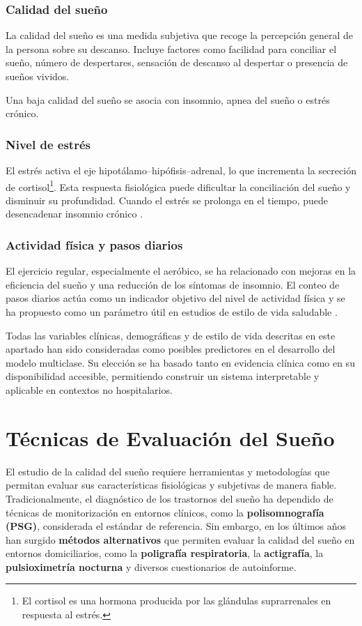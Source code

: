 \subsubsection{Calidad del sueño}
La calidad del sueño es una medida subjetiva que recoge la percepción general de la persona sobre su descanso. Incluye factores como facilidad para conciliar el sueño, número de despertares, sensación de descanso al despertar o presencia de sueños vividos.

Una baja calidad del sueño se asocia con insomnio, apnea del sueño o estrés crónico.


\subsubsection{Nivel de estrés}
El estrés activa el eje hipotálamo–hipófisis–adrenal, lo que incrementa la secreción de cortisol\footnote{El cortisol es una hormona producida por las glándulas suprarrenales en respuesta al estrés.}. Esta respuesta fisiológica puede dificultar la conciliación del sueño y disminuir su profundidad. Cuando el estrés se prolonga en el tiempo, puede desencadenar insomnio crónico \cite{nivel_estres}.


\subsubsection{Actividad física y pasos diarios}
El ejercicio regular, especialmente el aeróbico, se ha relacionado con mejoras en la eficiencia del sueño y una reducción de los síntomas de insomnio. El conteo de pasos diarios actúa como un indicador objetivo del nivel de actividad física y se ha propuesto como un parámetro útil en estudios de estilo de vida saludable \cite{efectoActividad}.


\noindent
Todas las variables clínicas, demográficas y de estilo de vida descritas en este apartado han sido consideradas como posibles predictores en el desarrollo del modelo multiclase. Su elección se ha basado tanto en evidencia clínica como en su disponibilidad accesible, permitiendo construir un sistema interpretable y aplicable en contextos no hospitalarios. 



\section{Técnicas de Evaluación del Sueño}
El estudio de la calidad del sueño requiere herramientas y metodologías que permitan evaluar sus características fisiológicas y subjetivas de manera fiable. Tradicionalmente, el diagnóstico de los trastornos del sueño ha dependido de técnicas de monitorización en entornos clínicos, como la \textbf{polisomnografía (PSG)}, considerada el estándar de referencia. Sin embargo, en los últimos años han surgido \textbf{métodos alternativos} que permiten evaluar la calidad del sueño en entornos domiciliarios, como la \textbf{poligrafía respiratoria}, la \textbf{actigrafía}, la \textbf{pulsioximetría nocturna} y diversos cuestionarios de autoinforme.

